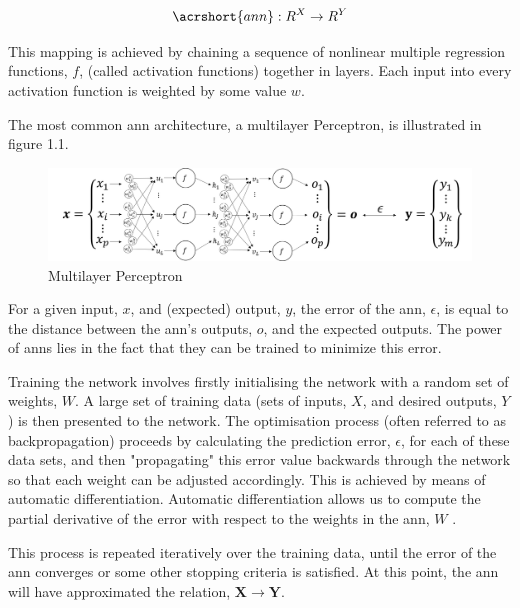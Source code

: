 \documentclass[11pt,oneside,openany,a4paper,english, report, goldenblock
]{usthesis}
\begin{document}
\begin{equation}
	\acrshort{ann}: R^X \rightarrow R^Y
\end{equation}

This mapping is achieved by chaining a sequence of nonlinear multiple regression functions, $f$, (called activation functions) together in layers.  Each input into every activation function is weighted by some value $w$.


The most common \acrshort{ann} architecture, a multilayer Perceptron, is illustrated in figure 1.1.

\begin{figure}[h]
	\centering
	\includegraphics[width=1\linewidth]{Images/Diagrams/NeuralNetwork}
	\caption[Multilayer Perceptron]{Multilayer Perceptron}
	\label{fig:neuralnetwork}
\end{figure}

For a given input, $x$, and (expected) output, $y$, the error of the \acrshort{ann}, $ \epsilon $, is equal to the distance between the \acrshort{ann}'s outputs, $o$, and the expected outputs. The power of \acrshort{ann}s lies in the fact that they can be trained to minimize this error. 


Training the network involves firstly initialising the network with a random set of weights, $W$. A large set of training data (sets of inputs, $X$, and desired outputs, $Y$) is then presented to the network. The optimisation process (often referred to as backpropagation) proceeds by calculating the prediction error, $ \epsilon $, for each of these data sets, and then "propagating" this error value backwards through the network so that each weight can be adjusted accordingly. This is achieved by means of automatic differentiation. Automatic differentiation allows us to compute the partial derivative of the error with respect to the weights in the \acrshort{ann}, $W$ \citep{Werbos}.


This process is repeated iteratively over the training data, until the error of the \acrshort{ann} converges or some other stopping criteria is satisfied. At this point, the \acrshort{ann} will have approximated the relation, $\mathbf{X}\rightarrow \mathbf{Y}$.
\end{document}
